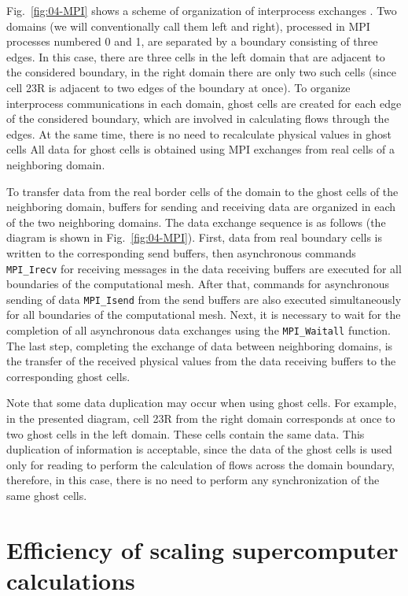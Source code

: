 \documentclass[
11pt,%
tightenlines,%
twoside,%
onecolumn,%
nofloats,%
nobibnotes,%
nofootinbib,%
superscriptaddress,%
noshowpacs,%
centertags]%
{revtex4}
\begin{document}
Fig.~\ref{fig:04-MPI} shows a scheme of organization of interprocess exchanges \cite{Rybakov_InnerRepresentation}.
Two domains (we will conventionally call them left and right), processed in MPI processes numbered 0 and 1, are separated by a boundary consisting of three edges.
In this case, there are three cells in the left domain that are adjacent to the considered boundary, in the right domain there are only two such cells (since cell 23R is adjacent to two edges of the boundary at once).
To organize interprocess communications in each domain, ghost cells are created for each edge of the considered boundary, which are involved in calculating flows through the edges.
At the same time, there is no need to recalculate physical values in ghost cells
All data for ghost cells is obtained using MPI exchanges from real cells of a neighboring domain.

To transfer data from the real border cells of the domain to the ghost cells of the neighboring domain, buffers for sending and receiving data are organized in each of the two neighboring domains.
The data exchange sequence is as follows (the diagram is shown in Fig.~\ref{fig:04-MPI}).
First, data from real boundary cells is written to the corresponding send buffers, then asynchronous commands \texttt{MPI\_Irecv} for receiving messages in the data receiving buffers are executed for all boundaries of the computational mesh.
After that, commands for asynchronous sending of data \texttt{MPI\_Isend} from the send buffers are also executed simultaneously for all boundaries of the computational mesh.
Next, it is necessary to wait for the completion of all asynchronous data exchanges using the \texttt{MPI\_Waitall} function.
The last step, completing the exchange of data between neighboring domains, is the transfer of the received physical values from the data receiving buffers to the corresponding ghost cells.

Note that some data duplication may occur when using ghost cells.
For example, in the presented diagram, cell 23R from the right domain corresponds at once to two ghost cells in the left domain.
These cells contain the same data.
This duplication of information is acceptable, since the data of the ghost cells is used only for reading to perform the calculation of flows across the domain boundary, therefore, in this case, there is no need to perform any synchronization of the same ghost cells.

\section{Efficiency of scaling supercomputer calculations}
\end{document}
